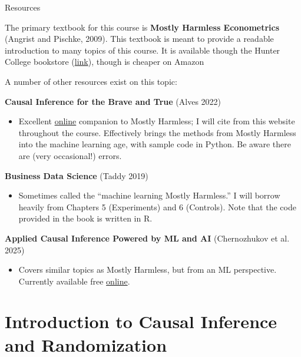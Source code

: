 \documentclass[handout, 8pt]{beamer}
\begin{document}
\begin{frame}{Resources}

The primary textbook for this course is \textbf{Mostly Harmless Econometrics} (Angrist and Pischke, 2009).
This textbook is meant to provide a readable introduction to many topics of this course. 
It is available though the Hunter College bookstore (\href{https://hunter.textbookx.com/institutional/index.php?action=browse\#books/4891202/}{link}), though is cheaper on Amazon 

\vspace{2ex}
A number of other resources exist on this topic:

\vspace{1ex}
\textbf{Causal Inference for the Brave and True} (Alves 2022)
\begin{itemize}
\item Excellent \href{https://matheusfacure.github.io/python-causality-handbook/landing-page.html}{online} companion to Mostly Harmless; I will cite from this website throughout the course. Effectively brings the methods from Mostly Harmless into the machine learning age, with sample code in Python. Be aware there are (very occasional!) errors.
\end{itemize}

\vspace{1ex}
\textbf{Business Data Science} (Taddy 2019) %
\begin{itemize}
\item Sometimes called the ``machine learning Mostly Harmless.'' I will borrow heavily from Chapters 5 (Experiments) and 6 (Controls). Note that the code provided in the book is written in R. 
\end{itemize}

\vspace{1ex}
\textbf{Applied Causal Inference Powered by ML and AI} (Chernozhukov et al. 2025)
\begin{itemize}
\item Covers similar topics as Mostly Harmless, but from an ML perspective. Currently available free \href{https://causalml-book.org/}{online}. 
\end{itemize}

\end{frame}


\section[Intro Causal Inference]{Introduction to Causal Inference and Randomization}
\miniframesoff
\begin{frame}
    \tableofcontents[currentsection]
\end{frame}
\miniframeson
\end{document}

